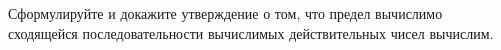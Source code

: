Сформулируйте и докажите утверждение о том, что предел вычислимо сходящейся последовательности вычислимых действительных
чисел вычислим.